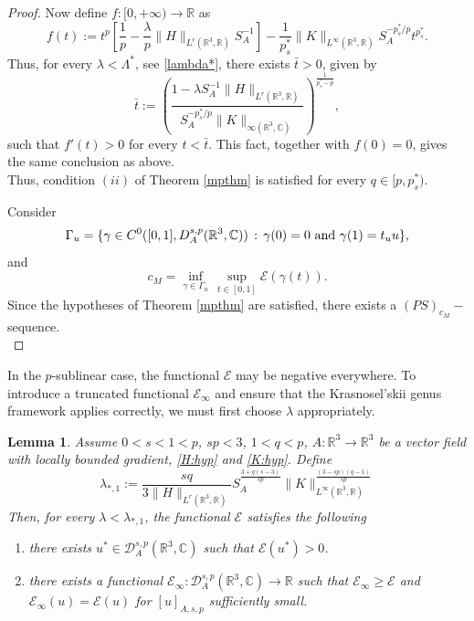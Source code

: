 \documentclass[leqno,11pt]{amsart}
\newcommand{\R}{\mathbb R}
\newcommand{\CC}{\mathbb C}
\newcommand{\C}{\mathbb C}
\newcommand{\cE}{{\mathcal E}}
\newcommand{\cD}{{\mathcal D}}
\numberwithin{equation}{section}
\newtheorem{lemma}[theorem]{Lemma}
\begin{document}
\begin{proof}
Now define $f:[0,+\infty) \to \R$ as 
$$f(t):=t^p\left[\frac1p- \frac{\lambda}{p}\|H\|_{L^r(\R^3,\R)}S_A^{-1}\right]-\frac{1}{p^*_s}\|K\|_{L^\infty(\R^3,\R)} S_A^{-p^*_s/p}t^{p^*_s}.$$
Thus, for every $\lambda<\Lambda^*$, see \eqref{lambda*}, there exists $\bar{t}>0$, given by
\begin{equation}
\bar
t:=\left(\frac{1-\lambda S_A^{-1}\|H\|_{L^r(\R^3,\R)}}{S_A^{-p^*_s/p}\|K\|_{\infty(\R^3,\C)}}\right)^{\frac{1}{p^*_s-p}},
\end{equation}
such that $f'(t)>0$ for every $t < \bar{t}$. This fact, together with $f(0)=0$, gives the same conclusion as above.\\

Thus, condition $(ii)$ of Theorem \ref{mpthm} is satisfied for every $q\in[p,p^*_s)$.


Consider
$$\Gamma_u=\{\gamma\in C^0([0,1],D^{s,p}_A(\R^3,\C))\, : \, \gamma(0)=0\hbox{ and }\gamma(1)=t_u u\},$$
and
\begin{equation}\label{cu}
c_M=\inf_{\gamma\in\Gamma_u}\,\sup_{t\in [0,1]}\cE(\gamma(t)).
\end{equation}
Since the hypotheses of Theorem \ref{mpthm} are satisfied, there exists a $(PS)_{c_M}-$ sequence.\\


\end{proof}







In the $p$-sublinear case, the functional $\mathcal{E}$ may be negative everywhere. To introduce a truncated functional $\mathcal{E}_\infty$ and ensure that the Krasnosel’skii genus framework applies correctly, we must first choose $\lambda$ appropriately.


\begin{lemma}\label{genus_geometry}
Assume $0<s<1<p$, $sp <3$, $1<q<p$, $A:\R^3 \to \R^3$ be a vector field with locally bounded gradient, \eqref{H:hyp} and \eqref{K:hyp}. Define
\begin{equation}\label{lambdagenus}
        \lambda_{*,1}:=\frac{sq}{3\|H\|_{L^r(\R^3,\R)}}S_A^{\frac{3+q(s-3)}{sp}}\|K\|_{L^\infty(\R^3,\R)}^{\frac{(3-sp)(q-1)}{sp}}
    \end{equation}
Then, for every $\lambda<\lambda_{*,1}$, the functional $\cE$ satisfies the following
\begin{enumerate}[label=\arabic*)]
\item there exists $u^*\in \cD^{s,p}_A(\R^3,\CC)$ such that $\cE(u^*)>0$.
\item there exists a functional $\cE_\infty: \cD^{s,p}_A(\R^3,\CC)\to \R$ such that $\cE_\infty\ge \cE$ and $\cE_\infty(u)= \cE(u)$ for $[u]_{A,s,p}$ sufficiently small.
\end{enumerate}
\end{lemma}
\end{document}
